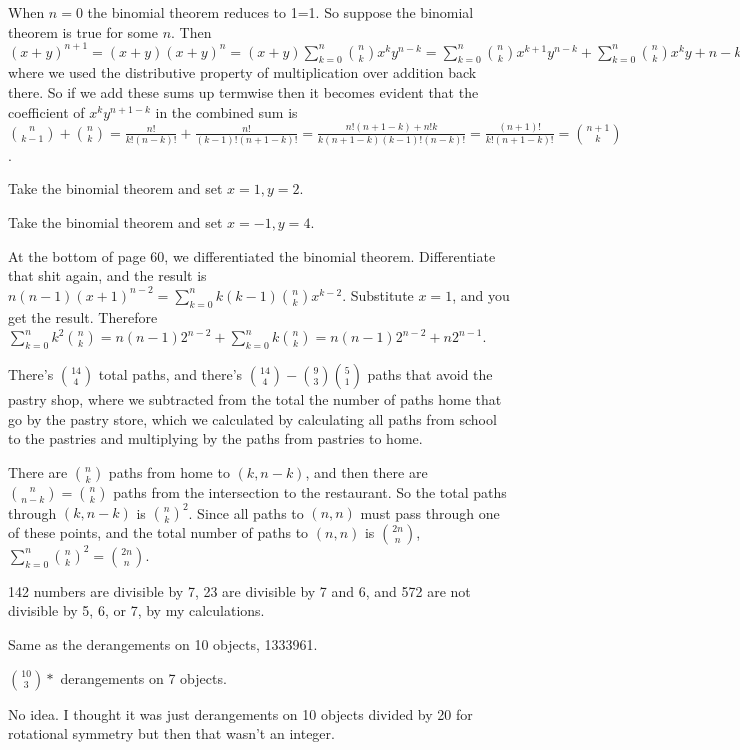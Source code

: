 \documentclass[11pt, oneside]{article}   	%
\begin{document}
\be
\item When $n=0$ the binomial theorem reduces to 1=1. So suppose the binomial theorem is true for some $n$. Then $(x + y)^{n+1} = (x + y)(x+y)^{n} = (x+y)\sum_{k=0}^n {n \choose k}x^ky^{n-k} = \sum_{k=0}^n {n \choose k} x^{k+1}y^{n-k} + \sum_{k=0}^n {n \choose k} x^ky+{n-k+1}$ where we used the distributive property of multiplication over addition back there. So if we add these sums up termwise then it becomes evident that the coefficient of $x^ky^{n+1-k}$ in the combined sum is ${n \choose k-1} + {n \choose k} = \frac{n!}{k!(n-k)!} + \frac{n!}{(k-1)!(n + 1 - k)!} = \frac{n!(n + 1 - k) + n!k}{k(n+1-k)(k-1)!(n-k)!} = \frac{(n+1)!}{k!(n + 1 - k)!} = {n + 1 \choose k}$. 
\item Take the binomial theorem and set $x=1, y=2$.
\item Take the binomial theorem and set $x=-1, y=4$. 
\item At the bottom of page 60, we differentiated the binomial theorem. Differentiate that shit again, and the result is $n(n - 1) (x + 1)^{n - 2} = \sum_{k=0}^n k(k-1){n \choose k}x^{k-2}.$ Substitute $x=1$, and you get the result. Therefore $\sum_{k=0}^nk^2{n \choose k} = n(n -1)2^{n - 2} + \sum_{k = 0}^n k {n \choose k} = n(n-1)2^{n-2} + n2^{n-1}$. 
\item There's ${14 \choose 4}$ total paths, and there's ${14 \choose 4} - {9 \choose 3}{5 \choose 1}$ paths that avoid the pastry shop, where we subtracted from the total the number of paths home that go by the pastry store, which we calculated by calculating all paths from school to the pastries and multiplying by the paths from pastries to home.
\item There are ${n \choose k}$ paths from home to $(k, n-k)$, and then there are ${n \choose n-k} = {n \choose k}$ paths from the intersection to the restaurant. So the total paths through $(k, n-k)$ is ${n \choose k}^2$. Since all paths to $(n, n)$ must pass through one of these points, and the total number of paths to $(n, n)$ is ${2n \choose n}$, $\sum_{k=0}^n {n \choose k}^2 = {2n \choose n}$. 
\item 142 numbers are divisible by 7, 23 are divisible by 7 and 6, and 572 are not divisible by 5, 6, or 7, by my calculations.
\item \be
\item Same as the derangements on 10 objects, 1333961. 
\item ${10 \choose 3} *$ derangements on 7 objects.
\item No idea. I thought it was just derangements on 10 objects divided by 20 for rotational symmetry but then that wasn't an integer.
\end{document}
